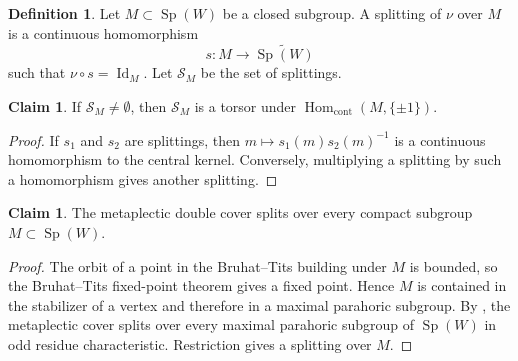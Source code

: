 \documentclass[11pt,a4paper,twoside]{amsart}
\theoremstyle{definition}
\newtheorem{definition}[theorem]{Definition}
\newtheorem{claim}[theorem]{Claim}
\theoremstyle{remark}
\newcommand{\mcS}{\mathcal S}
\newcommand{\emp}{\emptyset}
\newcommand{\Sp}{\operatorname{Sp}}
\newcommand{\Id}{\operatorname{Id}}
\newcommand{\Hom}{\operatorname{Hom}}
\begin{document}
\begin{definition}\label{M}
Let $M\subset\Sp(W)$ be a closed subgroup. A splitting of $\nu$ over $M$ is a continuous homomorphism
$$
s:M\longrightarrow\widetilde{\Sp(W)}
$$
such that $\nu\circ s=\Id_M$. Let $\mcS_M$ be the set of splittings.
\end{definition}
\begin{claim}\label{Z2}
If $\mcS_M\neq\emp$, then $\mcS_M$ is a torsor under $\Hom_{\mathrm{cont}}(M,\{\pm1\})$.
\end{claim}
\begin{proof}
If $s_1$ and $s_2$ are splittings, then $m\mapsto s_1(m)s_2(m)^{-1}$ is a continuous homomorphism to the central kernel. Conversely, multiplying a splitting by such a homomorphism gives another splitting.
\end{proof}
\begin{claim}\label{heis}
The metaplectic double cover splits over every compact subgroup $M\subset\Sp(W)$.
\end{claim}
\begin{proof}
The orbit of a point in the Bruhat--Tits building under $M$ is bounded, so the Bruhat--Tits fixed-point theorem gives a fixed point. Hence $M$ is contained in the stabilizer of a vertex and therefore in a maximal parahoric subgroup. By \cite[Proposition~4.1]{HW}, the metaplectic cover splits over every maximal parahoric subgroup of $\Sp(W)$ in odd residue characteristic. Restriction gives a splitting over $M$.
\end{proof}
\end{document}
